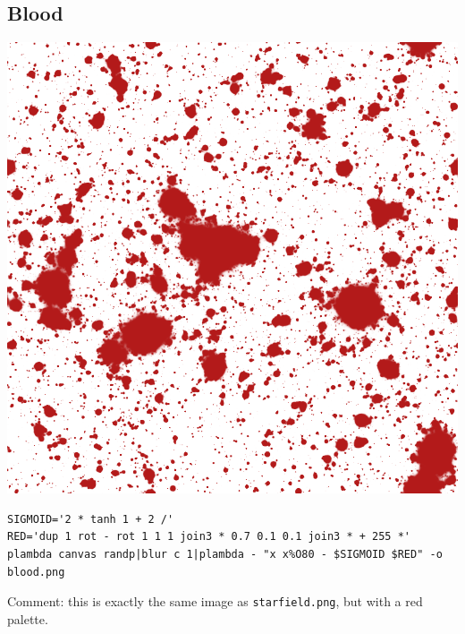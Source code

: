 \subsection{Blood}
\includegraphics{blood.png}
\begin{verbatim}
SIGMOID='2 * tanh 1 + 2 /'
RED='dup 1 rot - rot 1 1 1 join3 * 0.7 0.1 0.1 join3 * + 255 *'
plambda canvas randp|blur c 1|plambda - "x x%O80 - $SIGMOID $RED" -o blood.png
\end{verbatim}
Comment: this is exactly the same image as \verb+starfield.png+, but with a
red palette.

